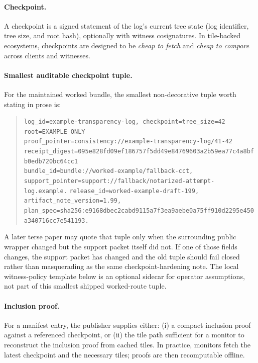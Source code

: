 \documentclass[11pt]{article}
\begin{document}
\paragraph{Checkpoint.}
A checkpoint is a signed statement of the log's current tree state (log identifier, tree size, and root hash), optionally with witness cosignatures.
In tile-backed ecosystems, checkpoints are designed to be \emph{cheap to fetch} and \emph{cheap to compare} across clients and witnesses.

\paragraph{Smallest auditable checkpoint tuple.}
For the maintained worked bundle, the smallest non-decorative tuple worth stating in prose is:
\begin{quote}\small
\nolinkurl{log_id=example-transparency-log, checkpoint=tree_size=42 root=EXAMPLE_ONLY}\\
\texttt{proof\_pointer=consistency://example-transparency-log/41-42}\\
\texttt{receipt\_digest=095e828fd09ef186757f5dd49e84769603a2b59ea77c4a8bfb0edb720bc64cc1}\\
\texttt{bundle\_id=bundle://worked-example/fallback-cct, support\_pointer=support://fallback/notarized-attempt-log.example.}
\texttt{release\_id=worked-example-draft-199, artifact\_note\_version=1.99, plan\_spec=sha256:e9168dbec2cabd9115a7f3ea9aebe0a75ff910d2295e450a340716cc7e541193.}
\end{quote}
A later terse paper may quote that tuple only when the surrounding public wrapper changed but the support packet itself did not.
If one of those fields changes, the support packet has changed and the old tuple should fail closed rather than masquerading as the same checkpoint-hardening note.
The local witness-policy template below is an optional sidecar for operator assumptions, not part of this smallest shipped worked-route tuple.

\paragraph{Inclusion proof.}
For a manifest entry, the publisher supplies either:
(i) a compact inclusion proof against a referenced checkpoint, or
(ii) the tile path sufficient for a monitor to reconstruct the inclusion proof from cached tiles.
In practice, monitors fetch the latest checkpoint and the necessary tiles; proofs are then recomputable offline.
\end{document}

